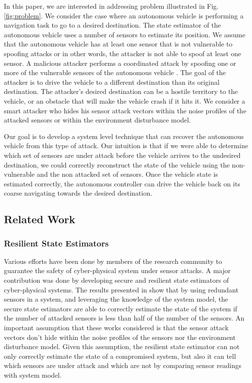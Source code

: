 \documentclass[conference]{IEEEtran}
\begin{document}
In this paper, we are interested in addressing problem illustrated in Fig.\ref{fig:problem}. We consider the case where an autonomous vehicle is performing a navigation task to go to a desired destination. The state estimator of the autonomous vehicle uses a number of sensors to estimate its position. We assume that the autonomous vehicle has at least one sensor that is not vulnerable to spoofing attacks or in other words, the attacker is not able to spoof at least one sensor. A malicious attacker performs a coordinated attack by spoofing one or more of the vulnerable sensors of the autonomous vehicle . The goal of the attacker is to drive the vehicle to a different destination than its original destination. The attacker's desired destination can be a hostile territory to the vehicle, or an obstacle that will make the vehicle crash if it hits it. We consider a smart attacker who hides his sensor attack vectors within the noise profiles of the attacked sensors or within the environment disturbance model.

Our goal is to develop a system level technique that can recover the autonomous vehicle from this type of attack. Our intuition is that if we were able to determine which set of sensors are under attack before the vehicle arrives to the undesired destination, we could correctly reconstruct the state of the vehicle using the non-vulnerable and the non attacked set of sensors. Once the vehicle state is estimated correctly, the autonomous controller can drive the vehicle back on its coarse navigating towards the desired destination.

\subsection{Related Work}\label{subsec:related}
\subsubsection{Resilient State Estimators}

Various efforts have been done by members of the research community to guarantee the safety of cyber-physical system under sensor attacks. A major contribution was done by developing secure and resilient state estimators of cyber-physical systems. The results presented in \cite{Fawzi2014,Ivanov2014,Pajic2014,Pajic2017} show that by using redundant sensors in a system, and leveraging the knowledge of the system model, the secure state estimators are able to correctly estimate the state of the system if the number of attacked sensors is less than half of the number of the sensors. An important assumption that these works considered is that the sensor attack vectors don't hide within the noise profiles of the sensors nor the environment disturbance model. Given this assumption, the resilient state estimator can not only correctly estimate the state of a compromised system, but also it can tell which sensors are under attack and which are not by comparing sensor readings with system model.
\end{document}
